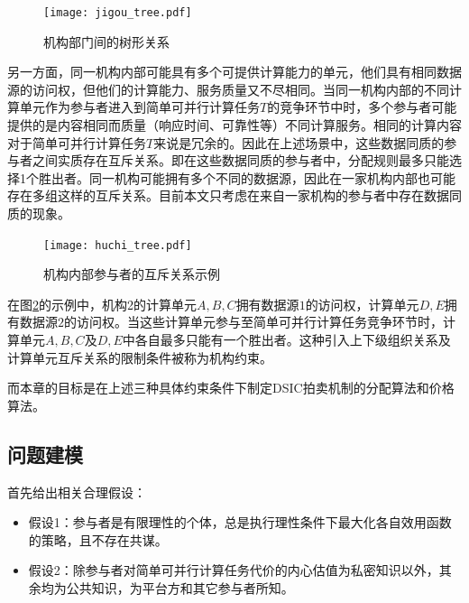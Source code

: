 \documentclass[promaster]{thesis-uestc}
\begin{document}
\begin{figure}[h]
\center
    \texttt{[image: jigou\_tree.pdf]}
    \caption{机构部门间的树形关系}
    \label{jigoushu}
\end{figure}

另一方面，同一机构内部可能具有多个可提供计算能力的单元，他们具有相同数据源的访问权，但他们的计算能力、服务质量又不尽相同。当同一机构内部的不同计算单元作为参与者进入到简单可并行计算任务$T$的竞争环节中时，多个参与者可能提供的是内容相同而质量（响应时间、可靠性等）不同计算服务。相同的计算内容对于简单可并行计算任务$T$来说是冗余的。因此在上述场景中，这些数据同质的参与者之间实质存在互斥关系。即在这些数据同质的参与者中，分配规则最多只能选择1个胜出者。同一机构可能拥有多个不同的数据源，因此在一家机构内部也可能存在多组这样的互斥关系。目前本文只考虑在来自一家机构的参与者中存在数据同质的现象。

\begin{figure}[h]
    \texttt{[image: huchi\_tree.pdf]}
    \caption{机构内部参与者的互斥关系示例}
    \label{huchishu}
\end{figure}

在图\ref{huchishu}的示例中，机构2的计算单元$A,B,C$拥有数据源$1$的访问权，计算单元$D,E$拥有数据源$2$的访问权。当这些计算单元参与至简单可并行计算任务竞争环节时，计算单元$A,B,C$及$D,E$中各自最多只能有一个胜出者。这种引入上下级组织关系及计算单元互斥关系的限制条件被称为机构约束。

而本章的目标是在上述三种具体约束条件下制定DSIC拍卖机制的分配算法和价格算法。

\FloatBarrier

\subsection{问题建模}
\label{xingshihua}

首先给出相关合理假设：

\begin{itemize}
    \item 假设1：参与者是有限理性的个体，总是执行理性条件下最大化各自效用函数的策略，且不存在共谋。
    \item 假设2：除参与者对简单可并行计算任务代价的内心估值为私密知识以外，其余均为公共知识，为平台方和其它参与者所知。
\end{itemize}
\end{document}
